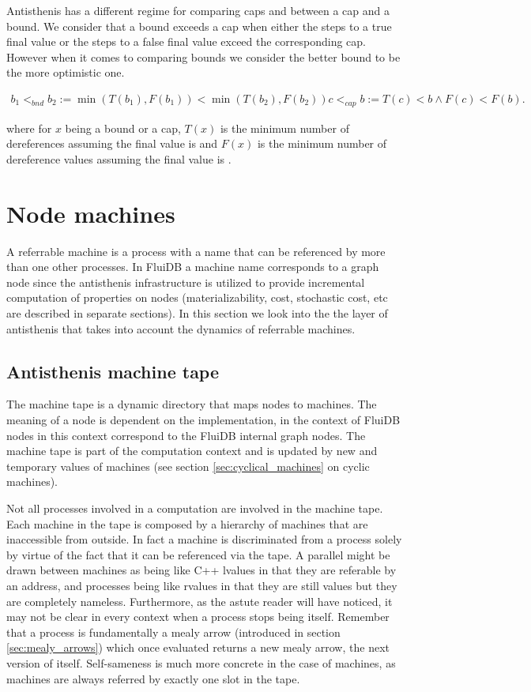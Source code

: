 Antisthenis has a different regime for comparing caps and between a
cap and a bound. We consider that a bound exceeds a cap when either
the steps to a true final value or the steps to a false final value
exceed the corresponding cap. However when it comes to comparing
bounds we consider the better bound to be the more optimistic one.

\begin{align*}
b_1 <_{bnd} b_2 := \min(T(b_1),F(b_1)) < \min(T(b_2),F(b_2))
c <_{cap} b := T(c) < b \land F(c) < F(b).
\end{align*}

where for \(x\) being a bound or a cap, \(T(x)\) is the minimum number
of dereferences assuming the final value is  and \(F(x)\)
is the minimum number of dereference values assuming the final value
is .




\section{Node machines}

A referrable machine is a process with a name that can be referenced
by more than one other processes. In FluiDB a machine name corresponds
to a graph node since the antisthenis infrastructure is utilized to
provide incremental computation of properties on nodes
(materializability, cost, stochastic cost, etc are described in
separate sections). In this section we look into the the layer of
antisthenis that takes into account the dynamics of referrable
machines.

\subsection{Antisthenis machine tape}

The machine tape is a dynamic directory that maps nodes to
machines. The meaning of a node is dependent on the implementation, in
the context of FluiDB nodes in this context correspond to the FluiDB
internal graph nodes. The machine tape is part of the computation
context and is updated by new and temporary values of machines (see
section \ref{sec:cyclical_machines} on cyclic machines).

Not all processes involved in a computation are involved in the
machine tape. Each machine in the tape is composed by a hierarchy of
machines that are inaccessible from outside. In fact a machine is
discriminated from a process solely by virtue of the fact that it can
be referenced via the tape. A parallel might be drawn between machines
as being like C++ lvalues in that they are referable by an address,
and processes being like rvalues in that they are still values but
they are completely nameless. Furthermore, as the astute reader will
have noticed, it may not be clear in every context when a process
stops being itself. Remember that a process is fundamentally a mealy
arrow (introduced in section \ref{sec:mealy_arrows}) which once
evaluated returns a new mealy arrow, the next version of
itself. Self-sameness is much more concrete in the case of machines,
as machines are always referred by exactly one slot in the tape.

